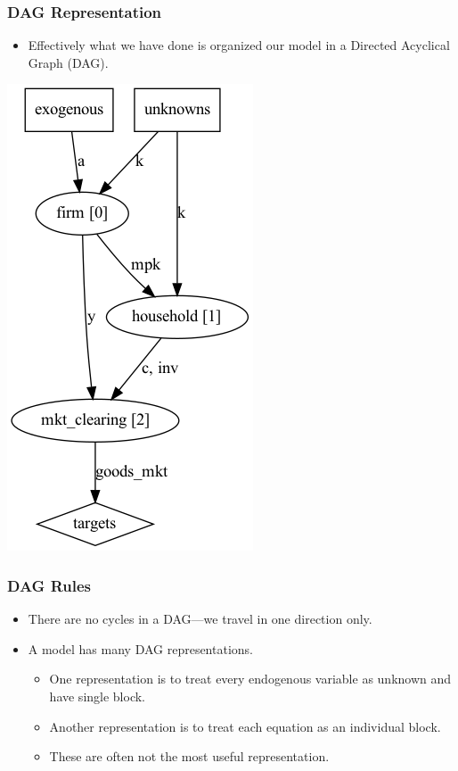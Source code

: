 \documentclass[english,xcolor=svgnames]{beamer}
\begin{document}
	\begin{frame}
		\frametitle{DAG Representation}
			\begin{itemize}
				\item Effectively what we have done is organized our model in a Directed Acyclical Graph (DAG).
			\end{itemize}
			\centering
			\includegraphics[scale=0.4]{dag/neoclassical.png}
	\end{frame}

	\begin{frame}
		\frametitle{DAG Rules}
			\begin{itemize}
				\item There are no cycles in a DAG---we travel in one direction only.
				\item A model has many DAG representations.
				\begin{itemize}
					\item One representation is to treat every endogenous variable as unknown and have single block.
					\item Another representation is to treat each equation as an individual block.
					\item These are often not the most useful representation.
				\end{itemize}
			\end{itemize}
	\end{frame}
	
\end{document}
